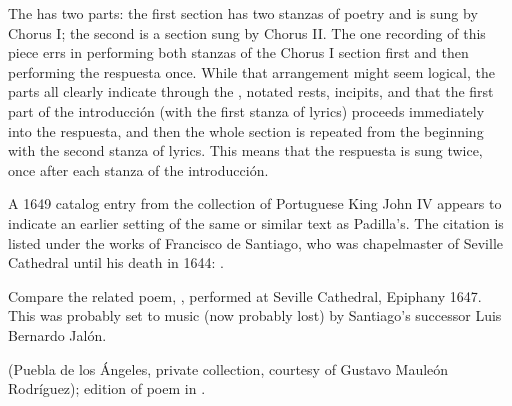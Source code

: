 The  has two parts: the first section has two stanzas of 
poetry and is sung by Chorus I; the second is a  
section sung by Chorus II.
The one recording of this piece errs in performing both stanzas of the Chorus I 
section first and then performing the respuesta once.
While that arrangement might seem logical, the parts all clearly indicate 
through the , notated rests, incipits, and 
 that the first part of the introducción (with the first stanza 
of lyrics) proceeds immediately into the respuesta, and then the whole section 
is repeated from the beginning with the second stanza of lyrics.
This means that the respuesta is sung twice, once after each stanza of the 
introducción.


A 1649 catalog entry from the collection of Portuguese King John IV appears to 
indicate an earlier setting of the same or similar text as Padilla's.
The citation is listed under the works of Francisco de Santiago, who was 
chapelmaster of Seville Cathedral until his death in 1644: .%
  \autocite[caixão 26, no.~674]{JohnIV:Catalog}

Compare the related poem, , performed at 
Seville Cathedral, Epiphany 1647.
This was probably set to music (now probably lost) by Santiago's successor Luis
Bernardo Jalón.%
\begin{Footnote}
     (Puebla de los Ángeles, private 
    collection, courtesy of Gustavo Mauleón Rodríguez); 
    edition of poem in \autocite[209]{Cashner:PhD}.
\end{Footnote}

\criticalnotesheader


